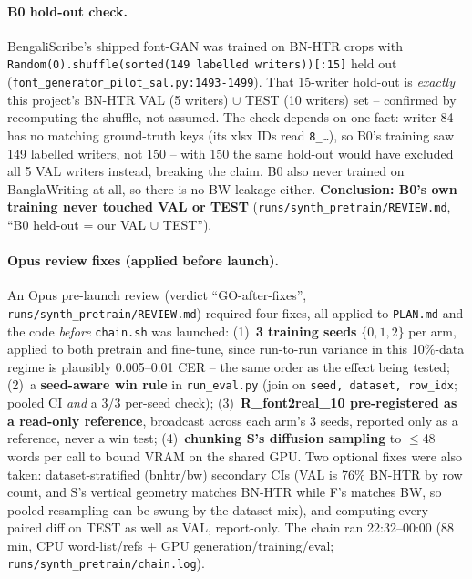 \documentclass[10.5pt,a4paper]{article}
\newcommand{\fp}[1]{\nolinkurl{#1}}
\begin{document}
\paragraph{B0 hold-out check.} BengaliScribe's shipped font-GAN was trained on BN-HTR crops with
\texttt{Random(0).shuffle(sorted(149 labelled writers))[:15]} held out (\fp{font\_generator\_pilot\_sal.py:1493-1499}). That
15-writer hold-out is \emph{exactly} this project's BN-HTR VAL (5 writers) $\cup$ TEST (10 writers) set -- confirmed by
recomputing the shuffle, not assumed. The check depends on one fact: writer 84 has no matching ground-truth keys (its xlsx
IDs read \texttt{8\_\ldots}), so B0's training saw 149 labelled writers, not 150 -- with 150 the same hold-out would have
excluded all 5 VAL writers instead, breaking the claim. B0 also never trained on BanglaWriting at all, so there is no BW
leakage either. \textbf{Conclusion: B0's own training never touched VAL or TEST} (\fp{runs/synth_pretrain/REVIEW.md},
``B0 held-out = our VAL $\cup$ TEST'').

\paragraph{Opus review fixes (applied before launch).} An Opus pre-launch review (verdict ``GO-after-fixes'',
\fp{runs/synth_pretrain/REVIEW.md}) required four fixes, all applied to \fp{PLAN.md} and the code \emph{before}
\fp{chain.sh} was launched: (1)~\textbf{3 training seeds} $\{0,1,2\}$ per arm, applied to both pretrain and fine-tune, since
run-to-run variance in this 10\%-data regime is plausibly 0.005--0.01 CER -- the same order as the effect being tested;
(2)~a \textbf{seed-aware win rule} in \fp{run\_eval.py} (join on \texttt{seed, dataset, row\_idx}; pooled CI \emph{and} a
3/3 per-seed check); (3)~\textbf{R\_font2real\_10 pre-registered as a read-only reference}, broadcast across each arm's 3
seeds, reported only as a reference, never a win test; (4)~\textbf{chunking S's diffusion sampling} to $\le$48 words per
call to bound VRAM on the shared GPU. Two optional fixes were also taken: dataset-stratified (bnhtr/bw) secondary CIs
(VAL is 76\% BN-HTR by row count, and S's vertical geometry matches BN-HTR while F's matches BW, so pooled resampling can
be swung by the dataset mix), and computing every paired diff on TEST as well as VAL, report-only. The chain ran
22:32--00:00 (88\,min, CPU word-list/refs + GPU generation/training/eval; \fp{runs/synth_pretrain/chain.log}).
\end{document}
